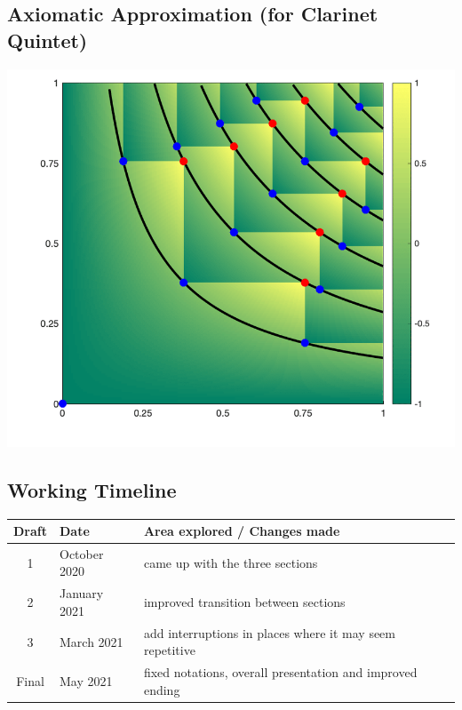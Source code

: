 \documentclass{article}
\begin{document}

\begin{center}
\vspace*{\fill}
\LARGE
    \section{Axiomatic Approximation (for Clarinet Quintet)}
    \includegraphics[width=\textwidth]{approximation.png}
\vspace*{\fill}
\end{center}

\newpage

\subsection{Working Timeline}
\begin{center}
	\def\arraystretch{1.5}
\begin{tabular}{|c|l|l|}
	\hline
	Draft&Date&Area explored / Changes made\\
	\hline
	1&October 2020&
    came up with the three sections\\
	\hline
	2&January 2021&
    improved transition between sections\\
	\hline
	3&March 2021&
    add interruptions in places where it may seem repetitive\\
	\hline
	Final&May 2021&
    fixed notations, overall presentation and improved ending\\
	\hline
\end{tabular}
\end{center}
\end{document}
